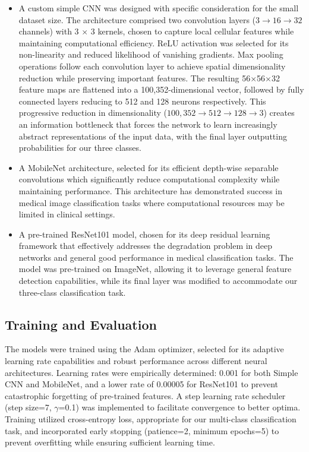 \begin{itemize}
    \item A custom simple CNN was designed with specific consideration for the small dataset size. The architecture comprised two convolution layers ($3 \rightarrow 16 \rightarrow 32$ channels) with 3 $\times$ 3 kernels, chosen to capture local cellular features while maintaining computational efficiency. ReLU activation was selected for its non-linearity and reduced likelihood of vanishing gradients. Max pooling operations follow each convolution layer to achieve spatial dimensionality reduction while preserving important features.  The resulting 56×56×32 feature maps are flattened into a 100,352-dimensional vector, followed by fully connected layers reducing to 512 and 128 neurons respectively. This progressive reduction in dimensionality ($100,352 \rightarrow 512 \rightarrow 128 \rightarrow 3$) creates an information bottleneck that forces the network to learn increasingly abstract representations of the input data, with the final layer outputting probabilities for our three classes.
    \item A MobileNet architecture\cite{DBLP:journals/corr/HowardZCKWWAA17}, selected for its efficient depth-wise separable convolutions which significantly reduce computational complexity while maintaining performance. This architecture has demonstrated success in medical image classification tasks where computational resources may be limited in clinical settings.\cite{SHARMA2024637}
    \item A pre-trained ResNet101 model\cite{ResNet101}, chosen for its deep residual learning framework that effectively addresses the degradation problem in deep networks and general good performance in medical classification tasks\cite{https://doi.org/10.1155/2021/2485934}. The model was pre-trained on ImageNet, allowing it to leverage general feature detection capabilities, while its final layer was modified to accommodate our three-class classification task.
\end{itemize}

\subsection{Training and Evaluation}
The models were trained using the Adam optimizer, selected for its adaptive learning rate capabilities and robust performance across different neural architectures. Learning rates were empirically determined: 0.001 for both Simple CNN and MobileNet, and a lower rate of 0.00005 for ResNet101 to prevent catastrophic forgetting of pre-trained features. A step learning rate scheduler (step size=7, $\gamma$=0.1) was implemented to facilitate convergence to better optima. Training utilized cross-entropy loss, appropriate for our multi-class classification task, and incorporated early stopping (patience=2, minimum epochs=5) to prevent overfitting while ensuring sufficient learning time.

